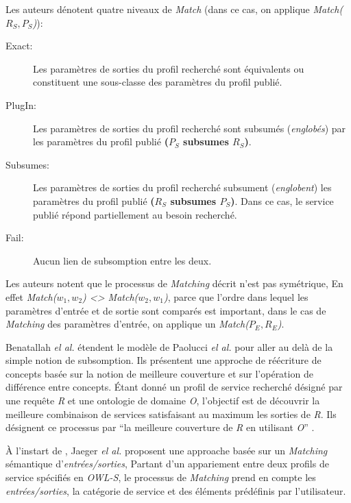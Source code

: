     \newpage
    Les auteurs dénotent quatre niveaux de \textit{Match} (dans ce
    cas, on applique \textit{Match($R_S, P_S$)}):

    \renewcommand{\descriptionlabel}[1]{\hspace{1cm}--~\textsf{#1}}
    \begin{description}
    \item [Exact:] Les paramètres de sorties du profil recherché sont
      équivalents ou constituent une sous-classe des paramètres du
      profil publié.

    \item [PlugIn:] Les paramètres de sorties du profil recherché sont
      subsumés (\textit{englobés}) par les paramètres du profil publié
      \textbf{($P_S$ subsumes $R_S$)}.

    \item [Subsumes:] Les paramètres de sorties du profil recherché
      subsument (\textit{englobent}) les paramètres du profil publié
      \textbf{($R_S$ subsumes $P_S$)}. Dans ce cas, le service publié
      répond partiellement au besoin recherché.

    \item [Fail:] Aucun lien de subsomption entre les deux.
    \end{description}
    \enddescription

    Les auteurs notent que le processus de \textit{Matching} décrit
    n'est pas symétrique, En effet \textit{Match($w_1, w_2$) <>
      Match($w_2, w_1$)}, parce que l'ordre dans lequel les paramètres
    d'entrée et de sortie sont comparés est important, dans le cas de
    \textit{Matching} des paramètres d'entrée, on applique un
    \textit{Match($P_E, R_E$)}.\bigskip

    Benatallah \emph{el al.} \cite{benatallah2005automating,
      benatallah2003request} étendent le modèle de Paolucci \emph{el
      al.}  pour aller au delà de la simple notion de subsomption. Ils
    présentent une approche de réécriture de concepts basée sur la
    notion de meilleure couverture et sur l'opération de différence
    entre concepts. Étant donné un profil de service recherché désigné
    par une requête \textit{R} et une ontologie de domaine \textit{O},
    l'objectif est de découvrir la meilleure combinaison de services
    satisfaisant au maximum les sorties de \textit{R}. Ils désignent
    ce processus par ``la meilleure couverture de \textit{R} en
    utilisant \textit{O}'' \cite{elie2010}.\bigskip

    À l'instart de \cite{paolucci2002semantic}, Jaeger \emph{el al.}
    \cite{jaeger2005ranked} proposent une approache basée sur un
    \textit{Matching} sémantique d'\textit{entrées/sorties}, Partant
    d'un appariement entre deux profils de service spécifiés en
    \textit{OWL-S}, le processus de \textit{Matching} prend en compte
    les \textit{entrées/sorties}, la catégorie de service et des
    éléments prédéfinis par l'utilisateur.\bigskip

